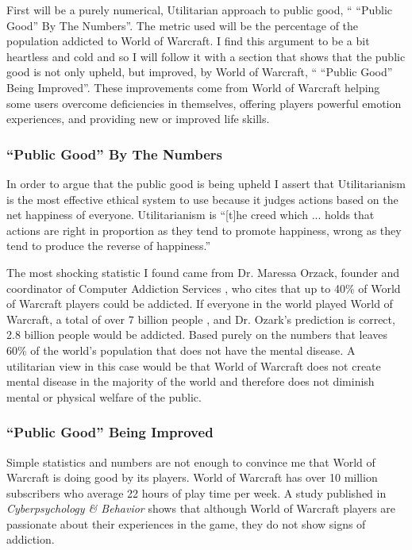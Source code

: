 \documentclass[11pt]{article}
\begin{document}
\begin{multicols}{2}
First will be a purely numerical, Utilitarian approach to public good, `` ``Public Good'' By The Numbers''. The metric used will be the percentage of the population addicted to World of Warcraft. I find this argument to be a bit heartless and cold and so I will follow it with a section that shows that the public good is not only upheld, but improved, by World of Warcraft, `` ``Public Good'' Being Improved''. These improvements come from World of Warcraft helping some users overcome deficiencies in themselves, offering players powerful emotion experiences, and providing new or improved life skills.

\subsubsection{``Public Good'' By The Numbers}
In order to argue that the public good is being upheld I assert that Utilitarianism is the most effective ethical system to use because it judges actions based on the net happiness of everyone. Utilitarianism is ``[t]he creed which ... holds that actions are right in proportion as they tend to promote happiness, wrong as they tend to produce the reverse of happiness.'' \cite{Utilitarianism}

The most shocking statistic I found came from Dr. Maressa Orzack, founder and coordinator of Computer Addiction Services \cite{CompAddictionServices}, who cites that up to 40\% of World of Warcraft players could be addicted. \cite{FortyPercentAddicted} If everyone in the world played World of Warcraft, a total of over 7 billion people \cite{WorldPopulation}, and Dr. Ozark's prediction is correct, 2.8 billion people would be addicted. Based purely on the numbers that leaves 60\% of the world's population that does not have the mental disease. A utilitarian view in this case would be that World of Warcraft does not create mental disease in the majority of the world and therefore does not diminish mental or physical welfare of the public.

\subsubsection{``Public Good'' Being Improved}
Simple statistics and numbers are not enough to convince me that World of Warcraft is doing good by its players. World of Warcraft has over 10 million subscribers \cite{WoWPlayerCount} who average 22 hours of play time per week. \cite{PlayerMotivations} A study published in \emph{Cyberpsychology \& Behavior} \cite{ExcessiveUseForSocialAspects} shows that although World of Warcraft players are passionate about their experiences in the game, they do not show signs of addiction.


\end{multicols}
\end{document}
